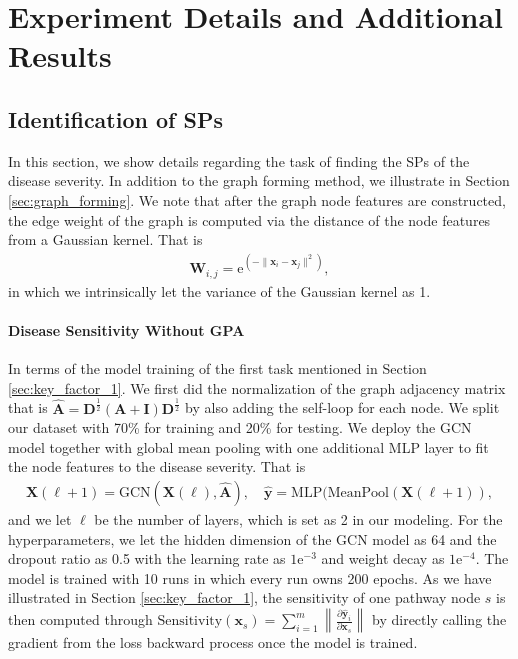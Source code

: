 \documentclass{article} %
\begin{document}
\section{Experiment Details and Additional Results}\label{append:experiment}

\subsection{Identification of SPs}
In this section, we show details regarding the task of finding the SPs of the disease severity. In addition to the graph forming method, we illustrate in Section \ref{sec:graph_forming}. We note that after the graph node features are constructed, the edge weight of the graph is computed via the distance of the node features from a Gaussian kernel. That is
\begin{align}
    \mathbf W_{i,j} = \mathrm{e}^{(-\|\mathbf x_i - \mathbf x_j\|^2)},
\end{align}
in which we intrinsically let the variance of the Gaussian kernel as 1. 

\paragraph{Disease Sensitivity Without GPA}
In terms of the model training of the first task mentioned in Section \ref{sec:key_factor_1}. We first did the normalization of the graph adjacency matrix that is $\widehat{\mathbf A} = \mathbf D^\frac12 (\mathbf A + \mathbf I) \mathbf D^\frac12$ by also adding the self-loop for each node. We split our dataset with 70\% for training and 20\% for testing. We deploy the GCN model together with global mean pooling with one additional MLP layer to fit the node features to the disease severity. That is
\begin{align}
    \mathbf X (\ell +1 ) = \mathrm{GCN} (\mathbf X(\ell), \widehat{\mathbf A}), \quad \widehat{\mathbf y} = \mathrm{MLP}(\mathrm{MeanPool}(\mathbf X(\ell +1)),
\end{align}
and we let $\ell$ be the number of layers, which is set as 2 in our modeling. For the hyperparameters, we let the hidden dimension of the GCN model as 64 and the dropout ratio as 0.5 with the learning rate as $1\mathrm{e}^{-3}$ and weight decay as $1\mathrm{e}^{-4}$. The model is trained with 10 runs in which every run owns 200 epochs. As we have illustrated in Section \ref{sec:key_factor_1}, the sensitivity of one pathway node $s$ is then computed through $\mathrm{Sensitivity}(\mathbf x_s) = \sum_{i=1}^m\left\|\frac{\partial \widehat {\mathbf y}_i}{\partial \mathbf x_s}\right \|$ by directly calling the gradient from the loss backward process once the model is trained. 
\end{document}
